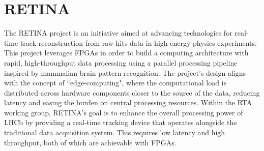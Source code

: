 \section{RETINA}

The RETINA project\cite{Lazzari:2801062} is an initiative aimed at advancing technologies for real-time track reconstruction from raw hits data in high-energy physics experiments. This project leverages FPGAs in order to build a computing architecture with rapid, high-throughput data processing using a parallel processing pipeline inspired by mammalian brain pattern recognition. The project's design aligns with the concept of ``edge-computing", where the computational load is distributed across hardware components closer to the source of the data, reducing latency and easing the burden on central processing resources.
Within the RTA working group, RETINA’s goal is to enhance the overall processing power of LHCb by providing a real-time tracking device that operates alongside the traditional data acquisition system. This requires low latency and high throughput, both of which are achievable with FPGAs. 


